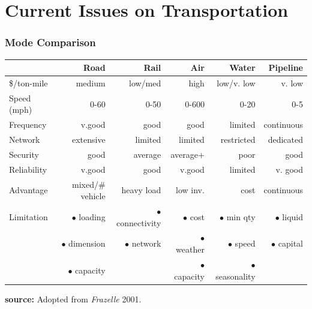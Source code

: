 \documentclass[10pt,presentation]{beamer}
\begin{document}
\section[Issue]{Current Issues on Transportation}
\begin{frame}
  \frametitle{Mode Comparison}

  \begin{center}
  \footnotesize{
  \begin{tabular}{lrrrrr} \hline
                   & Road                 & Rail        & Air         & Water           & Pipeline        \\  \hline
    \$/ton-mile    & medium               & low/med     & high        & \alert{low/v. low}      & v. low  \\
    Speed (mph)    & 0-60                 & 0-50        & \alert{0-600}& 0-20           & 0-5 \\
    Frequency      & \alert{v.good}               & good        & good        & limited         & \alert{continuous} \\
    Network        & \alert{extensive}    & limited     & limited     & \alert{restricted}      & dedicated \\
    Security       & good                 & average     & average+    & poor          & good \\
    Reliability    & v.good               & good        & \alert{v.good}      & limited     & v. good \\
    Advantage      & mixed/\# vehicle     & heavy load  & low inv.    & cost    & continuous \\
    Limitation     & $\bullet$ loading    & $\bullet$ connectivity    & $\bullet$ cost     & $\bullet$ min qty    & $\bullet$ liquid\\
                   & $\bullet$ dimension  & $\bullet$ network         & $\bullet$ weather  & $\bullet$ speed      & $\bullet$ capital \\
                   & $\bullet$ capacity   &                           & $\bullet$ capacity & $\bullet$ seasonality&   \\ \hline
  \end{tabular}
  }
  \end{center}

  \begin{flushright}
    \tiny{\textbf{source:} Adopted from \textsl{Frazelle} 2001. }
  \end{flushright}

  \end{frame}
\end{document}

